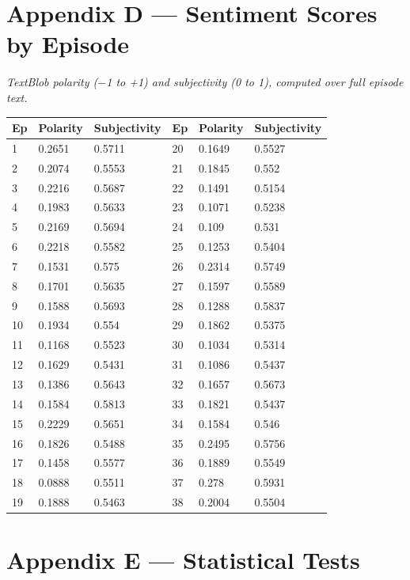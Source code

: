 \documentclass[11pt]{article}
\begin{document}
\FloatBarrier
\needspace{0.46\textheight}
\section*{Appendix D --- Sentiment Scores by Episode}

\emph{TextBlob polarity ($-$1 to +1) and subjectivity (0 to 1), computed over full episode text.}

\begin{center}
\small\setlength{\tabcolsep}{4pt}
\begin{tabular}{llllll}
\toprule
Ep & Polarity & Subjectivity & Ep & Polarity & Subjectivity \\
\midrule
1 & 0.2651 & 0.5711 & 20 & 0.1649 & 0.5527 \\
2 & 0.2074 & 0.5553 & 21 & 0.1845 & 0.552 \\
3 & 0.2216 & 0.5687 & 22 & 0.1491 & 0.5154 \\
4 & 0.1983 & 0.5633 & 23 & 0.1071 & 0.5238 \\
5 & 0.2169 & 0.5694 & 24 & 0.109 & 0.531 \\
6 & 0.2218 & 0.5582 & 25 & 0.1253 & 0.5404 \\
7 & 0.1531 & 0.575 & 26 & 0.2314 & 0.5749 \\
8 & 0.1701 & 0.5635 & 27 & 0.1597 & 0.5589 \\
9 & 0.1588 & 0.5693 & 28 & 0.1288 & 0.5837 \\
10 & 0.1934 & 0.554 & 29 & 0.1862 & 0.5375 \\
11 & 0.1168 & 0.5523 & 30 & 0.1034 & 0.5314 \\
12 & 0.1629 & 0.5431 & 31 & 0.1086 & 0.5437 \\
13 & 0.1386 & 0.5643 & 32 & 0.1657 & 0.5673 \\
14 & 0.1584 & 0.5813 & 33 & 0.1821 & 0.5437 \\
15 & 0.2229 & 0.5651 & 34 & 0.1584 & 0.546 \\
16 & 0.1826 & 0.5488 & 35 & 0.2495 & 0.5756 \\
17 & 0.1458 & 0.5577 & 36 & 0.1889 & 0.5549 \\
18 & 0.0888 & 0.5511 & 37 & 0.278 & 0.5931 \\
19 & 0.1888 & 0.5463 & 38 & 0.2004 & 0.5504 \\
\bottomrule
\end{tabular}
\end{center}

\FloatBarrier
\needspace{0.27\textheight}
\section*{Appendix E --- Statistical Tests}
\end{document}
